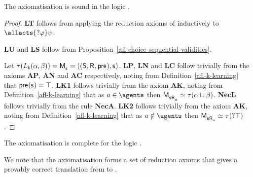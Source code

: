 \begin{proposition}\label{afl-k-axioms-soundness}
The axiomatisation \axiomAflK{} is sound in the logic \logicAmlK{}.
\end{proposition}

\begin{proof}
{\bf LT} follows from applying the reduction axioms of \axiomAmlK{} inductively to $\allacts{\test{\phi}} \psi$.

{\bf LU} and {\bf LS} follow from Proposition~\ref{afl-choice-sequential-validities}.

Let $\tau(\learns_\agentB (\alpha, \beta)) = \aPModel{\aStateS} = \aPModelTuple{\aStateS}$.
{\bf LP}, {\bf LN} and {\bf LC} follow trivially from the \axiomAmlK{} axioms {\bf AP}, {\bf AN} and {\bf AC} respectively, noting from Definition~\ref{afl-k-learning} that $\aPrecondition(\aStateS) = \top$.
{\bf LK1} follows trivially from the \axiomAmlK{} axiom {\bf AK}, noting from Definition~\ref{afl-k-learning} that as $\agentA \in \agents$ then $\aPModel{\aStateS \aAccessibility{\agentA}} \bisimilar \tau(\alpha \choice \beta)$.
{\bf NecL} follows trivially from the \axiomAmlK{} rule {\bf NecA}.
{\bf LK2} follows trivially from the \axiomAmlK{} axiom {\bf AK}, noting from Definition~\ref{afl-k-learning} that as $\agentA \notin \agents$ then $\aPModel{\aStateS \aAccessibility{\agentA}} \bisimilar \tau(\test{\top})$.
\end{proof}

\begin{proposition}\label{afl-k-axioms-completeness}
The axiomatisation \axiomAflK{} is complete for the logic \logicAmlK{}.
\end{proposition}

We note that the axiomatisation \axiomAflK{} forms a set of reduction axioms that gives a provably correct translation from \langAfl{} to \lang{}.

